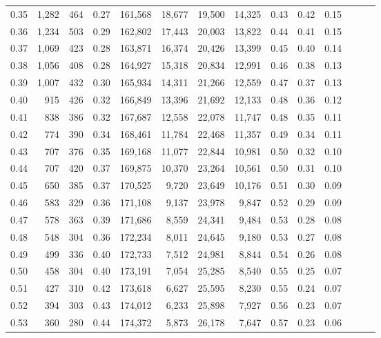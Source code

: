 \begin{tabular}{rrrrrrrrrrrrrr}
0.35 &   1,282 &  464 &  0.27 &  161,568 &   18,677 &  19,500 &  14,325 &  0.43 &  0.42 &      0.15 \\
0.36 &   1,234 &  503 &  0.29 &  162,802 &   17,443 &  20,003 &  13,822 &  0.44 &  0.41 &      0.15 \\
0.37 &   1,069 &  423 &  0.28 &  163,871 &   16,374 &  20,426 &  13,399 &  0.45 &  0.40 &      0.14 \\
0.38 &   1,056 &  408 &  0.28 &  164,927 &   15,318 &  20,834 &  12,991 &  0.46 &  0.38 &      0.13 \\
0.39 &   1,007 &  432 &  0.30 &  165,934 &   14,311 &  21,266 &  12,559 &  0.47 &  0.37 &      0.13 \\
0.40 &     915 &  426 &  0.32 &  166,849 &   13,396 &  21,692 &  12,133 &  0.48 &  0.36 &      0.12 \\
0.41 &     838 &  386 &  0.32 &  167,687 &   12,558 &  22,078 &  11,747 &  0.48 &  0.35 &      0.11 \\
0.42 &     774 &  390 &  0.34 &  168,461 &   11,784 &  22,468 &  11,357 &  0.49 &  0.34 &      0.11 \\
0.43 &     707 &  376 &  0.35 &  169,168 &   11,077 &  22,844 &  10,981 &  0.50 &  0.32 &      0.10 \\
0.44 &     707 &  420 &  0.37 &  169,875 &   10,370 &  23,264 &  10,561 &  0.50 &  0.31 &      0.10 \\
0.45 &     650 &  385 &  0.37 &  170,525 &    9,720 &  23,649 &  10,176 &  0.51 &  0.30 &      0.09 \\
0.46 &     583 &  329 &  0.36 &  171,108 &    9,137 &  23,978 &   9,847 &  0.52 &  0.29 &      0.09 \\
0.47 &     578 &  363 &  0.39 &  171,686 &    8,559 &  24,341 &   9,484 &  0.53 &  0.28 &      0.08 \\
0.48 &     548 &  304 &  0.36 &  172,234 &    8,011 &  24,645 &   9,180 &  0.53 &  0.27 &      0.08 \\
0.49 &     499 &  336 &  0.40 &  172,733 &    7,512 &  24,981 &   8,844 &  0.54 &  0.26 &      0.08 \\
0.50 &     458 &  304 &  0.40 &  173,191 &    7,054 &  25,285 &   8,540 &  0.55 &  0.25 &      0.07 \\
0.51 &     427 &  310 &  0.42 &  173,618 &    6,627 &  25,595 &   8,230 &  0.55 &  0.24 &      0.07 \\
0.52 &     394 &  303 &  0.43 &  174,012 &    6,233 &  25,898 &   7,927 &  0.56 &  0.23 &      0.07 \\
0.53 &     360 &  280 &  0.44 &  174,372 &    5,873 &  26,178 &   7,647 &  0.57 &  0.23 &      0.06 \\

\end{tabular}
